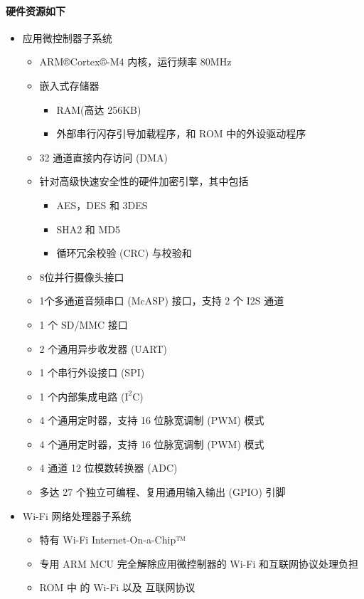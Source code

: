 \documentclass[a4paper]{ctexart}
\begin{document}
  \paragraph*{硬件资源如下}
  \begin{itemize}
    \item 应用微控制器子系统
    \begin{itemize}
      \item ARM®Cortex®-M4 内核，运行频率 80MHz
      \item 嵌入式存储器
      \begin{itemize}
        \item RAM(高达 256KB)
        \item 外部串行闪存引导加载程序，和 ROM 中的外设驱动程序
      \end{itemize}
      \item 32 通道直接内存访问 (DMA)
      \item 针对高级快速安全性的硬件加密引擎，其中包括
      \begin{itemize}
        \item AES，DES 和 3DES
        \item SHA2 和 MD5
        \item 循环冗余校验 (CRC) 与校验和
      \end{itemize}
      \item 8位并行摄像头接口
      \item 1个多通道音频串口 (McASP) 接口，支持 2 个 I2S 通道
      \item 1 个 SD/MMC 接口
      \item 2 个通用异步收发器 (UART)
      \item 1 个串行外设接口 (SPI)
      \item 1 个内部集成电路 ($\mathrm{I^2C}$)
      \item 4 个通用定时器，支持 16 位脉宽调制 (PWM) 模式
      \item 4 个通用定时器，支持 16 位脉宽调制 (PWM) 模式
      \item 4 通道 12 位模数转换器 (ADC)
      \item 多达 27 个独立可编程、复用通用输入输出 (GPIO) 引脚
    \end{itemize}
    \item Wi-Fi 网络处理器子系统
    \begin{itemize}
      \item 特有 Wi-Fi Internet-On-a-Chip™
      \item 专用 ARM MCU 完全解除应用微控制器的 Wi-Fi 和互联网协议处理负担
      \item ROM 中 的 Wi-Fi 以及 互联网协议

\end{itemize}
\end{itemize}
\end{document}
